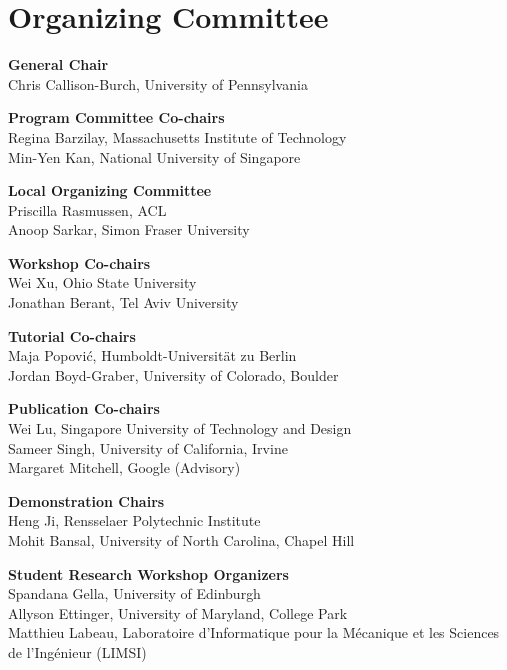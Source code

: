 \markboth{}{} %
\markright{}{} %

\section{Organizing Committee}{}\vspace{2em}

\setlength{\parindent}{0pt}

{\bf General Chair} \\
Chris Callison-Burch, University of Pennsylvania

{\bf Program Committee Co-chairs} \\
Regina Barzilay, Massachusetts Institute of Technology\\
Min-Yen Kan, National University of Singapore

{\bf Local Organizing Committee} \\
Priscilla Rasmussen, ACL\\
Anoop Sarkar, Simon Fraser University

{\bf Workshop Co-chairs} \\
Wei Xu, Ohio State University \\
Jonathan Berant, Tel Aviv University

{\bf Tutorial Co-chairs} \\
Maja Popovi\'{c}, Humboldt-Universität zu Berlin \\
Jordan Boyd-Graber, University of Colorado, Boulder

{\bf Publication Co-chairs} \\
Wei Lu, Singapore University of Technology and Design \\
Sameer Singh, University of California, Irvine \\
Margaret Mitchell, Google (Advisory)

{\bf Demonstration Chairs} \\
Heng Ji, Rensselaer Polytechnic Institute \\
Mohit Bansal, University of North Carolina, Chapel Hill

{\bf Student Research Workshop Organizers} \\
Spandana Gella, University of Edinburgh \\
Allyson Ettinger, University of Maryland, College Park \\
Matthieu Labeau, Laboratoire d’Informatique pour la Mécanique et les Sciences de l’Ingénieur (LIMSI) \\

